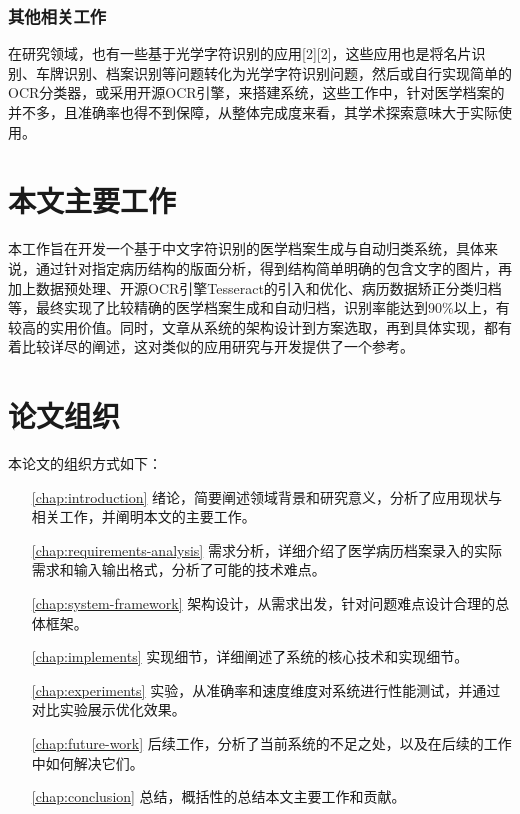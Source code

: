 \subsubsection{其他相关工作}
在研究领域，也有一些基于光学字符识别的应用[2][2]，这些应用也是将名片识别、车牌识别、档案识别等问题转化为光学字符识别问题，然后或自行实现简单的OCR分类器，或采用开源OCR引擎，来搭建系统，这些工作中，针对医学档案的并不多，且准确率也得不到保障，从整体完成度来看，其学术探索意味大于实际使用。



\section{本文主要工作}
本工作旨在开发一个基于中文字符识别的医学档案生成与自动归类系统，具体来说，通过针对指定病历结构的版面分析，得到结构简单明确的包含文字的图片，再加上数据预处理、开源OCR引擎Tesseract的引入和优化、病历数据矫正分类归档等，最终实现了比较精确的医学档案生成和自动归档，识别率能达到90\%以上，有较高的实用价值。同时，文章从系统的架构设计到方案选取，再到具体实现，都有着比较详尽的阐述，这对类似的应用研究与开发提供了一个参考。

\section{论文组织}
本论文的组织方式如下：
\begin{itemize}
	\item[\autoref{chap:introduction}] 
	绪论，简要阐述领域背景和研究意义，分析了应用现状与相关工作，并阐明本文的主要工作。
	\item[\autoref{chap:requirements-analysis}] 需求分析，详细介绍了医学病历档案录入的实际需求和输入输出格式，分析了可能的技术难点。
	\item[\autoref{chap:system-framework}] 
	架构设计，从需求出发，针对问题难点设计合理的总体框架。
	\item[\autoref{chap:implements}] 
	实现细节，详细阐述了系统的核心技术和实现细节。
	\item[\autoref{chap:experiments}]
	实验，从准确率和速度维度对系统进行性能测试，并通过对比实验展示优化效果。
	\item[\autoref{chap:future-work}]
	后续工作，分析了当前系统的不足之处，以及在后续的工作中如何解决它们。
	\item[\autoref{chap:conclusion}]
	总结，概括性的总结本文主要工作和贡献。
\end{itemize}